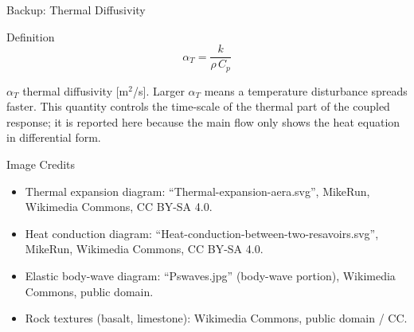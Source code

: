 \documentclass[aspectratio=169,10pt]{beamer}
\begin{document}
\begin{frame}{Backup: Thermal Diffusivity}
  \begin{block}{Definition}
    \[
      \alpha_{T} = \frac{k}{\rho\,C_{p}}
    \]
  \end{block}
  \vskip 4pt
  \footnotesize
  $\alpha_{T}$ thermal diffusivity [m$^2$/s].
  Larger $\alpha_{T}$ means a temperature disturbance spreads faster.
  This quantity controls the time-scale of the thermal part of the
  coupled response; it is reported here because the main flow only
  shows the heat equation in differential form.
\end{frame}

\begin{frame}{Image Credits}
  \footnotesize
  \begin{itemize}
    \item Thermal expansion diagram: ``Thermal-expansion-aera.svg'',
          MikeRun, Wikimedia Commons, CC BY-SA 4.0.
    \item Heat conduction diagram:
          ``Heat-conduction-between-two-resavoirs.svg'', MikeRun,
          Wikimedia Commons, CC BY-SA 4.0.
    \item Elastic body-wave diagram: ``Pswaves.jpg'' (body-wave portion),
          Wikimedia Commons, public domain.
    \item Rock textures (basalt, limestone): Wikimedia Commons,
          public domain / CC.
  \end{itemize}
\end{frame}
\end{document}
